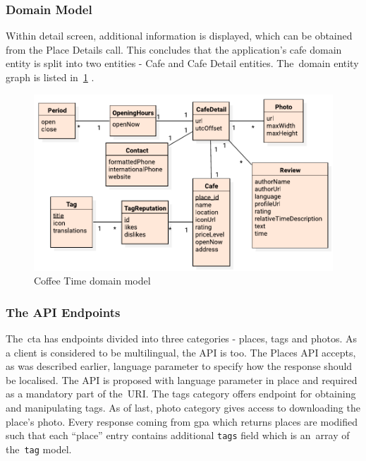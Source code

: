 \subsubsection{Domain Model}
Within detail screen, additional information is displayed, which can be obtained from the Place Details call. This concludes that the application's cafe domain entity is split into two entities - Cafe and Cafe Detail entities.  The~domain entity graph is listed in~\cref{fig:domain} .

\begin{figure}[ht]
    \centering
    \includegraphics[width=0.9\linewidth]{img/analysis/domain.pdf}
    \caption{Coffee Time domain model}
    \label{fig:domain}
\end{figure}
\subsubsection{The API Endpoints}
The~\gls{cta} has endpoints divided into three categories - places, tags and photos. As a client is considered to be multilingual, the API is too. The Places API accepts, as was described earlier, language parameter to specify how the response should be localised. The API is proposed with language parameter in place and required as a mandatory part of the~URI. The tags category offers endpoint for obtaining and manipulating tags. As of last, photo category gives access to downloading the place's photo. Every response coming from \gls{gpa} which returns places are modified such that each ``place'' entry contains additional \verb|tags| field which is an~array of the~\verb|tag| model. 

